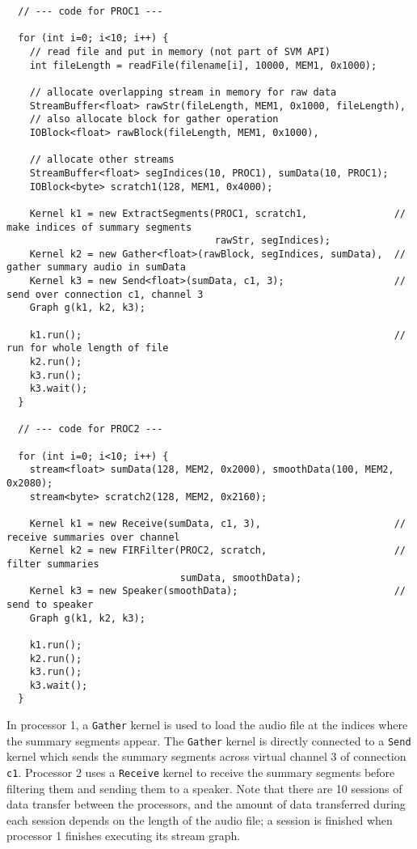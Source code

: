 {\small
\begin{verbatim}
  // --- code for PROC1 ---

  for (int i=0; i<10; i++) {
    // read file and put in memory (not part of SVM API)
    int fileLength = readFile(filename[i], 10000, MEM1, 0x1000);

    // allocate overlapping stream in memory for raw data
    StreamBuffer<float> rawStr(fileLength, MEM1, 0x1000, fileLength), 
    // also allocate block for gather operation
    IOBlock<float> rawBlock(fileLength, MEM1, 0x1000), 

    // allocate other streams
    StreamBuffer<float> segIndices(10, PROC1), sumData(10, PROC1);
    IOBlock<byte> scratch1(128, MEM1, 0x4000);

    Kernel k1 = new ExtractSegments(PROC1, scratch1,               // make indices of summary segments
                                    rawStr, segIndices);
    Kernel k2 = new Gather<float>(rawBlock, segIndices, sumData),  // gather summary audio in sumData
    Kernel k3 = new Send<float>(sumData, c1, 3);                   // send over connection c1, channel 3
    Graph g(k1, k2, k3);
            
    k1.run();                                                      // run for whole length of file
    k2.run();
    k3.run();
    k3.wait();
  }

  // --- code for PROC2 ---

  for (int i=0; i<10; i++) {
    stream<float> sumData(128, MEM2, 0x2000), smoothData(100, MEM2, 0x2080);
    stream<byte> scratch2(128, MEM2, 0x2160);

    Kernel k1 = new Receive(sumData, c1, 3),                       // receive summaries over channel
    Kernel k2 = new FIRFilter(PROC2, scratch,                      // filter summaries
                              sumData, smoothData);
    Kernel k3 = new Speaker(smoothData);                           // send to speaker
    Graph g(k1, k2, k3);

    k1.run();
    k2.run();
    k3.run();
    k3.wait();
  }   
\end{verbatim}}
In processor 1, a {\tt Gather} kernel is used to load the audio file
at the indices where the summary segments appear.  The {\tt Gather}
kernel is directly connected to a {\tt Send} kernel which sends the
summary segments across virtual channel 3 of connection {\tt c1}.
Processor 2 uses a {\tt Receive} kernel to receive the summary
segments before filtering them and sending them to a speaker.  Note
that there are 10 sessions of data transfer between the processors,
and the amount of data transferred during each session depends on the
length of the audio file; a session is finished when processor 1
finishes executing its stream graph.

